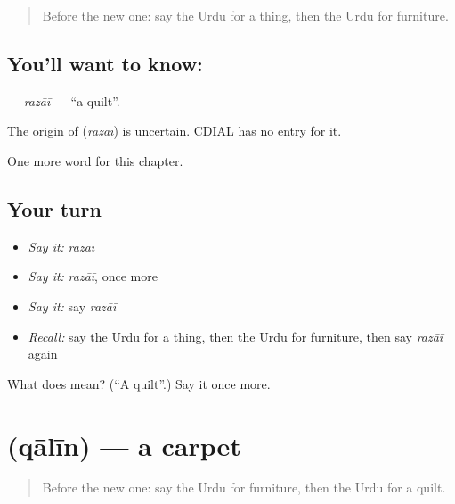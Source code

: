 \label{lesson:UR-C164-razai}



\begin{quote}
Before the new one: say the Urdu for a thing, then the Urdu for furniture.
\end{quote}

\subsection*{You'll want to know: }
\textbf{} — \emph{razāī} — \textquotedblleft{}a quilt\textquotedblright{}.

\begin{cousinweb}
The origin of \textbf{} (\emph{razāī}) is uncertain. CDIAL has no entry for it.
\end{cousinweb}

\begin{grammarlens}[title={What you've built}]
One more word for this chapter.
\end{grammarlens}

\subsection*{Your turn}
\begin{itemize}
\raggedright
  \item \emph{Say it:} \emph{razāī}
  \item \emph{Say it:} \emph{razāī}, once more
  \item \emph{Say it:} say \emph{razāī}
  \item \emph{Recall:} say the Urdu for a thing, then the Urdu for furniture, then say \emph{razāī} again
\end{itemize}

\begin{tcolorbox}[breakable,colback=teal!4,colframe=teal!35!black,title={Before you move on}]
What does  mean? (\textquotedblleft{}A quilt\textquotedblright{}.) Say it once more.
\end{tcolorbox}
\section[\texorpdfstring{\ur{قالین} (qālīn)}{قالین (qālīn)}]{ (qālīn) — a carpet}

\label{lesson:UR-C164-qalin}



\begin{quote}
Before the new one: say the Urdu for furniture, then the Urdu for a quilt.
\end{quote}

